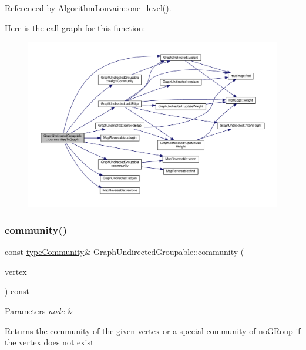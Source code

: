 Referenced by Algorithm\+Louvain\+::one\+\_\+level().

Here is the call graph for this function\+:
\nopagebreak
\begin{figure}[H]
\begin{center}
\leavevmode
\includegraphics[width=350pt]{classGraphUndirectedGroupable_af6fc2c9e8aad7c6bce37d30eeaf184a8_cgraph}
\end{center}
\end{figure}
\mbox{\label{classGraphUndirectedGroupable_ad40474d566b3f9fbe9d132fbbe562ed5}} 
\subsubsection{\texorpdfstring{community()}{community()}\hspace{0.1cm}{\footnotesize\ttfamily [1/2]}}
{\footnotesize\ttfamily const \hyperlink{graphUndirectedGroupable_8h_a914da95c9ea7f14f4b7f875c36818556}{type\+Community}\& Graph\+Undirected\+Groupable\+::community (\begin{DoxyParamCaption}\item[{const \hyperlink{edge_8h_a5fbd20c46956d479cb10afc9855223f6}{type\+Vertex} \&}]{vertex }\end{DoxyParamCaption}) const\hspace{0.3cm}{\ttfamily [inline]}}


\begin{DoxyParams}{Parameters}
{\em node} & \\
\hline
\end{DoxyParams}
\begin{DoxyReturn}{Returns}
the community of the given vertex or a special community of no\+G\+Roup if the vertex does not exist 
\end{DoxyReturn}


